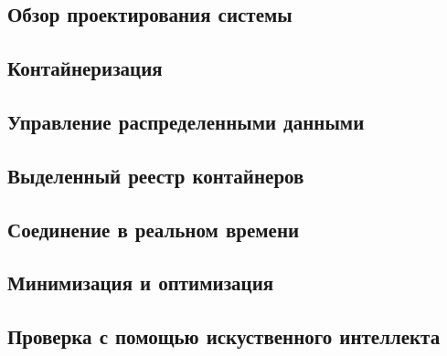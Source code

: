 \subsection{Обзор проектирования системы}

\subsection{Контайнеризация}

\subsection{Управление распределенными данными}

\subsection{Выделенный реестр контайнеров}

\subsection{Соединение в реальном времени}

\subsection{Минимизация и оптимизация}

\subsection{Проверка с помощью искуственного интеллекта}

